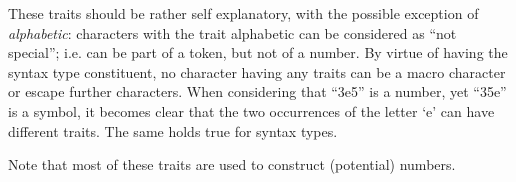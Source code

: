 \documentclass[a4paper,10pt,twoside]{article}
\newcommand{\el}{Emacs Lisp}
\newcommand{\fun}[1]{\texttt{#1}}
\begin{document}
These traits should be rather self explanatory, with the possible exception of
\emph{alphabetic}: characters with the trait alphabetic can be considered as
``not special''; i.e. can be part of a token, but not of a number.  By virtue of
having the syntax type constituent, no character having any traits can be a
macro character or escape further characters.  When considering that ``3e5'' is
a number, yet ``35e'' is a symbol, it becomes clear that the two occurrences of
the letter `e' can have different traits.  The same holds true for syntax types.

Note that most of these traits are used to construct (potential) numbers.

\begin{comment}
  \section{Lisp Basics}
  \label{subsec:lisp-basics}

  This section is only intended as a short recap of what Lisp syntax is, and how
  it relates to the reader.  For more details, a Lisp textbook is more
  appropriate.  A good reference for \el{} is found at \cite{elisp-reference}.
  The chapters

  Lisp syntax never directly describes control flow, function definitions, or
  other actions, but merely data.  If the described data consists of lists and
  symbols, it will later on be treated as code, which can be compiled and
  executed.\todo{Possibly show some Lisp examples.}

  Such data structures can represent code by having a list with an ``action'',
  which may be a special form, a macro or a function, as its first element.  Any
  further elements are arguments to said operator.

  As an example, here is some code which performs a variable binding with
  \fun{let} (which is a special form), an assignment with \fun{setf} (a macro)
  and a function call to \fun{message}.

\begin{lstlisting}[style=lispinline]
  (let ((var 5)) (setf var "Hello") (message "%s" var))
\end{lstlisting}

When Lisp source code is processed, it goes through three distinct stages:
reading, macro expansion (optionally this can also be a compile phase), and
evaluation (which can be the execution of compiled code).

The first stage is somewhat unique to Lisp---most languages only have this as an
implementation detail in the compiler or interpreter.


\end{comment}
\end{document}
